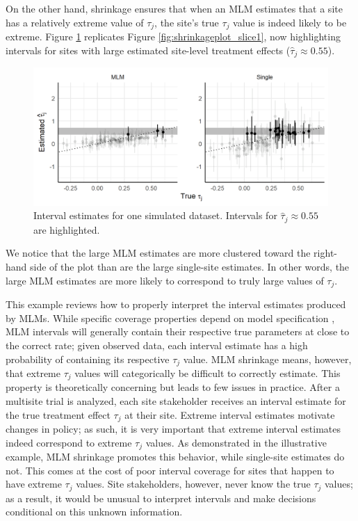 \documentclass[]{article}
\begin{document}
On the other hand, shrinkage ensures that when an MLM estimates that a site has a relatively extreme value of $\tau_j$, the site's true $\tau_j$ value is indeed likely to be extreme.
Figure \ref{fig:shrinkageplot_slice3} replicates Figure \ref{fig:shrinkageplot_slice1}, now highlighting intervals for sites with large estimated site-level treatment effects ($\hat{\tau}_j \approx 0.55$).
\begin{figure}[t]
	\centering
	\includegraphics[width=\textwidth]{shrinkageplot_slice3}
	\caption{Interval estimates for one simulated dataset. Intervals for $\hat{\tau}_j \approx 0.55$ are highlighted.}
	\label{fig:shrinkageplot_slice3}
\end{figure}
We notice that the large MLM estimates are more clustered toward the right-hand side of the plot than are the large single-site estimates.
In other words, the large MLM estimates are more likely to correspond to truly large values of $\tau_j$.

This example reviews how to properly interpret the interval estimates produced by MLMs.
While specific coverage properties depend on model specification \citep{armstrong2020robust}, MLM intervals will generally contain their respective true parameters at close to the correct rate; given observed data, each interval estimate has a high probability of containing its respective $\tau_j$ value.
MLM shrinkage means, however, that extreme $\tau_j$ values will categorically be difficult to correctly estimate.
This property is theoretically concerning but leads to few issues in practice.
After a multisite trial is analyzed, each site stakeholder receives an interval estimate for the true treatment effect $\tau_j$ at their site.
Extreme interval estimates motivate changes in policy; as such, it is very important that extreme interval estimates indeed correspond to extreme $\tau_j$ values.
As demonstrated in the illustrative example, MLM shrinkage promotes this behavior, while single-site estimates do not.
This comes at the cost of poor interval coverage for sites that happen to have extreme $\tau_j$ values.
Site stakeholders, however, never know the true $\tau_j$ values; as a result, it would be unusual to interpret intervals and make decisions conditional on this unknown information.
\end{document}
